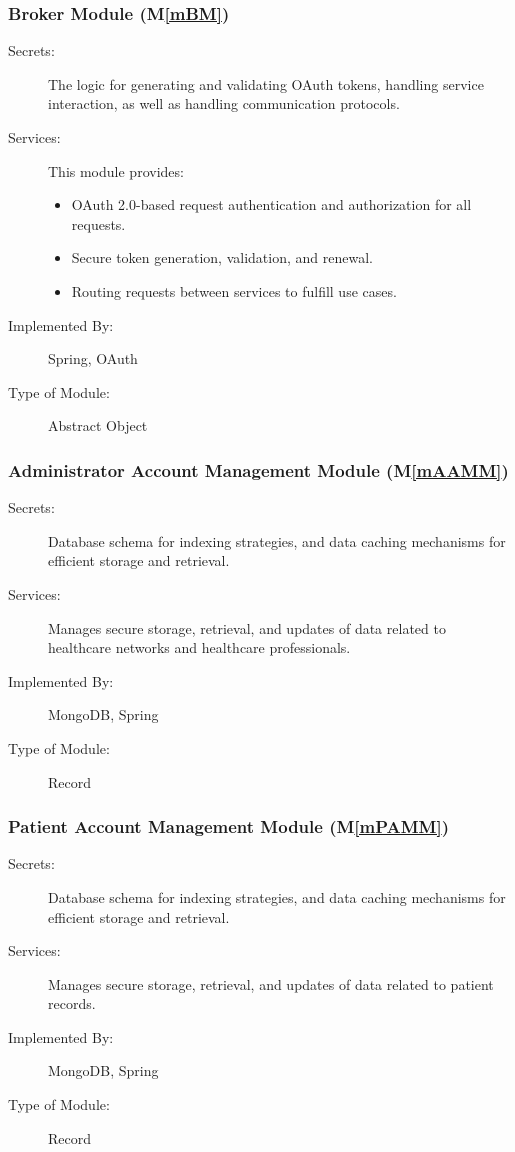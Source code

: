 \documentclass[12pt, titlepage]{article}
\newcommand{\mref}[1]{M\ref{#1}}
\begin{document}
\subsubsection{Broker Module (\mref{mBM})}

\begin{description}
\item[Secrets:]The logic for generating and validating OAuth tokens, handling service interaction, as well as handling communication protocols.
\item[Services:]This module provides:
\begin{itemize}
    \item OAuth 2.0-based request authentication and authorization for all requests.
    \item Secure token generation, validation, and renewal. 
    \item Routing requests between services to fulfill use cases.
\end{itemize}
\item[Implemented By:]Spring, OAuth
\item[Type of Module:]Abstract Object
\end{description}

\subsubsection{Administrator Account Management Module (\mref{mAAMM})}

\begin{description}
\item[Secrets:]Database schema for indexing strategies, and data caching mechanisms for efficient storage and retrieval.
\item[Services:]Manages secure storage, retrieval, and updates of data related to healthcare networks and healthcare professionals.
\item[Implemented By:]MongoDB, Spring
\item[Type of Module:]Record
\end{description}

\subsubsection{Patient Account Management Module (\mref{mPAMM})}

\begin{description}
\item[Secrets:]Database schema for indexing strategies, and data caching mechanisms for efficient storage and retrieval.
\item[Services:]Manages secure storage, retrieval, and updates of data related to patient records.
\item[Implemented By:]MongoDB, Spring
\item[Type of Module:]Record
\end{description}
\end{document}
